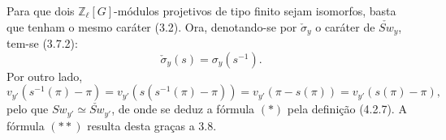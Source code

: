 \begin{prooftext}[Demonstração]
Para que dois $\mathbb Z_\ell[G]$-módulos projetivos de tipo finito sejam isomorfos, basta que tenham o mesmo caráter (3.2). Ora, denotando-se por $\check\sigma_y$ o caráter de $\check{Sw}_y$, tem-se (3.7.2):
\[
\check\sigma_y(s)=\sigma_y(s^{-1}).
\]
Por outro lado,
\[
v_{y'}(s^{-1}(\pi)-\pi)
=v_{y'}(s(s^{-1}(\pi)-\pi))
=v_{y'}(\pi-s(\pi))
=v_{y'}(s(\pi)-\pi),
\]
pelo que $Sw_{y'}\simeq\check{Sw}_{y'}$, de onde se deduz a fórmula $(*)$ pela definição (4.2.7). A fórmula $(**)$ resulta desta graças a 3.8.
\end{prooftext}
